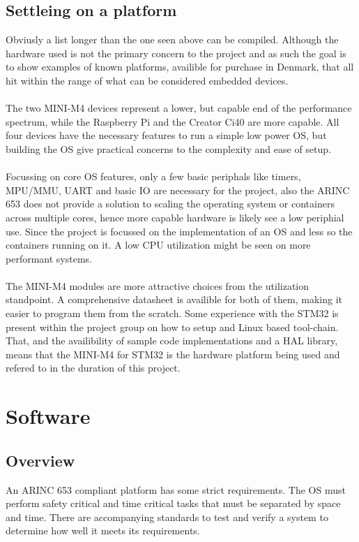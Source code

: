 \subsection{Settleing on a platform}
Obviusly a list longer than the one seen above can be compiled.
Although the hardware used is not the primary concern to the project
and as such the goal is to show examples of known platforms,
availible for purchase in Denmark,
that all hit within the range of what can be considered embedded devices.
\\\\
The two MINI-M4 devices represent a lower, but capable end of the performance spectrum,
while the Raspberry Pi and the Creator Ci40 are more capable.
All four devices have the necessary features to run a simple low power OS,
but building the OS give practical concerns to the complexity and ease of setup.
\\\\
Focussing on core OS features, only a few basic periphals
like timers, MPU/MMU, UART and basic IO are necessary for the project,
also the ARINC 653 does not provide a solution to scaling the operating system
or containers across multiple cores,
hence more capable hardware is likely see a low periphial use.
Since the project is focussed on the implementation of an OS
and less so the containers running on it.
A low CPU utilization might be seen on more performant systems.
\\\\
The MINI-M4 modules are more attractive choices from the utilization standpoint.
A comprehensive datasheet is availible for both of them,
making it easier to program them from the scratch.
Some experience with the STM32 is present within the project group
on how to setup and Linux based tool-chain.
That, and the availibility of sample code implementations and a HAL library,
means that the MINI-M4 for STM32 is the hardware platform being used and refered to
in the duration of this project.


\section{Software}
\subsection{Overview}
An ARINC 653 compliant platform has some strict requirements.
The OS must perform safety critical and time critical tasks that must be separated by space and time.
There are accompanying standards to test and verify a system to determine how well it meets its requirements.

